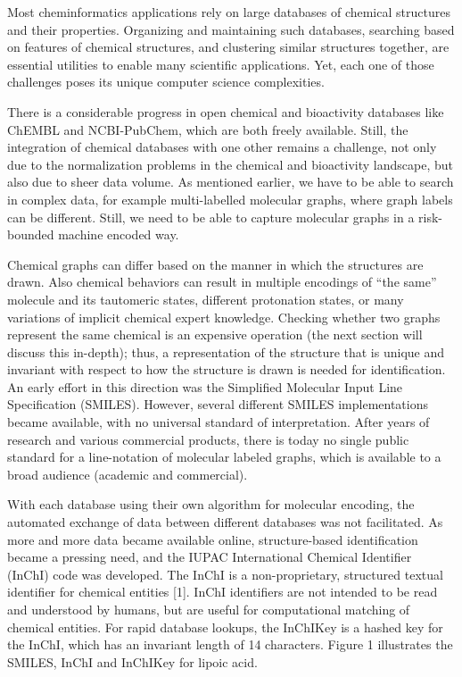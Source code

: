 \documentclass{sig-alternate}
\begin{document}
Most cheminformatics applications rely on large databases of chemical structures
and their properties. Organizing and maintaining such databases, searching based
on features of chemical structures, and clustering similar structures together,
are essential utilities to enable many scientific applications. Yet, each one of
those challenges poses its unique computer science complexities.

There is a considerable progress in open chemical and bioactivity databases like
ChEMBL and NCBI-PubChem, which are both freely available. Still, the integration
of chemical databases with one other remains a challenge, not only due to the
normalization problems in the chemical and bioactivity landscape, but also due
to sheer data volume. As mentioned earlier, we have to be able to
search in complex data, for example multi-labelled molecular graphs, where
graph labels can be different. Still, we need to be able to capture
molecular graphs in a risk-bounded machine encoded way.

Chemical graphs can differ based on the manner in which the structures
are drawn. Also chemical behaviors can result in multiple encodings of
``the same'' molecule and its tautomeric states, different protonation
states, or many variations of implicit chemical expert
knowledge. Checking whether two graphs represent the same chemical is
an expensive operation (the next section will discuss this in-depth);
thus, a representation of the structure that is unique and invariant
with respect to how the structure is drawn is needed for
identification. An early effort in this direction was the Simplified
Molecular Input Line Specification (SMILES). However, several
different SMILES implementations became available, with no universal
standard of interpretation. After years of research and various
commercial products, there is today no single public standard for a
line-notation of molecular labeled graphs, which is available to a
broad audience (academic and
commercial). %

With each database using their own algorithm for molecular encoding,
the automated exchange of data between different databases was not
facilitated. As more and more data became available online,
structure-based identification became a pressing need, and the IUPAC
International Chemical Identifier (InChI) code was developed. The
InChI is a non-proprietary, structured textual identifier for chemical
entities [1]. InChI identifiers are not intended to be read and
understood by humans, but are useful for computational matching of
chemical entities. For rapid database lookups, the InChIKey is a
hashed key for the InChI, which has an invariant length of 14
characters. Figure 1 illustrates the SMILES, InChI and InChIKey for
lipoic acid.
\end{document}
